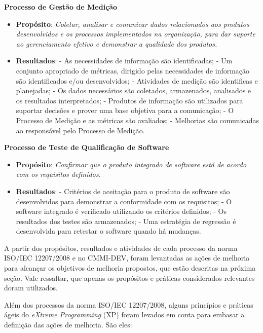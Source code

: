 \noindent
\textbf{Processo de Gestão de Medição}
\begin{itemize}
    \item \textbf{Propósito}: \emph{Coletar, analisar e comunicar dados relacionados aos produtos desenvolvidos e 
	  os processos implementados na organização, para dar suporte ao gerenciamento efetivo e demonstrar a qualidade dos produtos.}
    \item \textbf{Resultados}:
        \subitem - As necessidades de informação são identificadas;
	\subitem - Um conjunto apropriado de métricas, dirigido pelas necessidades de informação são identificados e/ou desenvolvidos;
	\subitem - Atividades de medição são identificas e planejadas;
	\subitem - Os dados necessários são coletados, armazenados, analisados e os resultados interpretados;
	\subitem - Produtos de informação são utilizados para suportar decisões e prover uma base objetiva para a comunicação;
	\subitem - O Processo de Medição e as métricas são avaliados;
	\subitem - Melhorias são comunicadas ao responsável pelo Processo de Medição.
\end{itemize}

\noindent
\textbf{Processo de Teste de Qualificação de Software}
\begin{itemize}
    \item \textbf{Propósito}: \emph{Confirmar que o produto integrado de software está de acordo com os requisitos definidos.}
    \item \textbf{Resultados}:
        \subitem - Critérios de aceitação para o produto de software são desenvolvidos para demonstrar a conformidade com os requisitos;
        \subitem - O software integrado é verificado utilizando os critérios definidos;
        \subitem - Os resultados dos testes são armazenados;
        \subitem - Uma estratégia de regressão é desenvolvida para retestar o software quando há mudanças.
\end{itemize}


A partir dos propósitos, resultados e atividades de cada processo da norma ISO/IEC 12207/2008 e no CMMI-DEV, foram levantadas as
ações de melhoria para alcançar os objetivos de melhoria propostos, que estão descritas na próxima seção. Vale ressaltar, que apenas os propósitos e
práticas considerados relevantes doram utilizados.

Além dos processos da norma ISO/IEC 12207/2008, alguns princípios e práticas ágeis do \textit{eXtreme Programming} (XP) \cite{xp} 
foram levados em conta para embasar a definição das ações de melhoria. São eles:

